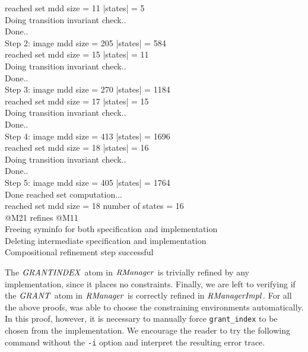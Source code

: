 {reached set mdd size =         11	 |states| =        5 \\
Doing transition invariant check.. \\
Done.. \\
Step 2: image mdd size =        205	 |states| =      584	 \\
reached set mdd size =         15	 |states| =       11 \\
Doing transition invariant check.. \\
Done.. \\
Step 3: image mdd size =        270	 |states| =     1184	 \\
reached set mdd size =         17	 |states| =       15 \\
Doing transition invariant check.. \\
Done.. \\
Step 4: image mdd size =        413	 |states| =     1696	 \\
reached set mdd size =         18	 |states| =       16 \\
Doing transition invariant check.. \\
Done.. \\
Step 5: image mdd size =        405	 |states| =     1764	 \\
Done reached set computation... \\
reached set mdd size =         18	 number of states =       16 \\
@M21 refines @M11 \\
Freeing syminfo for both specification and implementation \\
Deleting intermediate specification and implementation \\
Compositional refinement step successful \\
}

\mypar
\noindent
The ${\it GRANTINDEX\/}$ atom in  ${\it RManager\/}$ is trivially refined by any
implementation, since it places no constraints. Finally, we
are left to verifying if the ${\it GRANT\/}$ atom in ${\it RManager\/}$ is correctly
refined in ${\it RManagerImpl\/}$. For all the above proofs, \mocha
was able to choose the constraining environments automatically.
In this proof, however, it is necessary to manually force 
{\tt grant\_index} to be chosen from the implementation. 
We encourage the reader to try the following command
without the {\tt -i} option and interpret the resulting error
trace.

